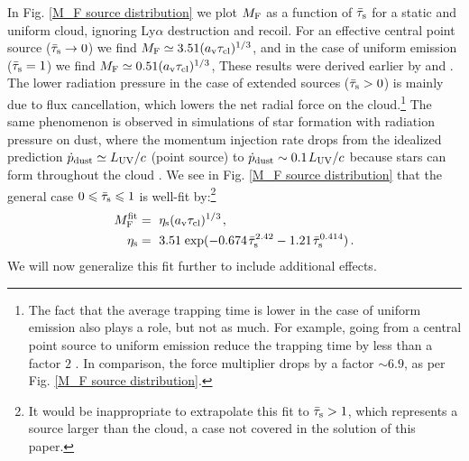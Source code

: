 \documentclass[fleqn,usenatbib]{mnras}
\newcommand{\taucl}{\tau_{\rm cl}}
\begin{document}
In Fig. \ref{M_F source distribution} we plot $M_{\rm F}$ as a function of $\Bar{\tau}_{\rm s}$ for a static and uniform cloud, ignoring Ly$\alpha$ destruction and recoil. For an effective central point source ($\Bar{\tau}_{\rm s} \rightarrow 0$) we find $M_{\rm F} \simeq 3.51 (a_{\rm v} \taucl)^{1/3}$, and in the case of uniform emission ($\Bar{\tau}_{\rm s} = 1$) we find $M_{\rm F} \simeq 0.51 (a_{\rm v} \taucl)^{1/3}$, These results were derived earlier by \cite{Lao2020} and \cite{Tomaselli2021}. The lower radiation pressure in the case of extended sources ($\Bar{\tau}_{\rm s} > 0$) is mainly due to flux cancellation, which lowers the net radial force on the cloud.\footnote{The fact that the average trapping time is lower in the case of uniform emission also plays a role, but not as much. For example, going from a central point source to uniform emission reduce the trapping time by less than a factor $2$ \citep[see fig. 1 in][]{Lao2020}. In comparison, the force multiplier drops by a factor $\sim 6.9$, as per Fig. \ref{M_F source distribution}.} The same phenomenon is observed in simulations of star formation with radiation pressure on dust, where the momentum injection rate drops from the idealized prediction $\Dot{p}_{\rm dust} \simeq L_{\rm UV}/c$ (point source) to $\Dot{p}_{\rm dust} \sim 0.1 \hspace{1 pt} L_{\rm UV}/c$ because stars can form throughout the cloud \citep{Kim2018_RadPressure, Menon2023_directRP}.
We see in Fig. \ref{M_F source distribution} that the general case $0 \leq \Bar{\tau}_{\rm s} \leq 1$ is well-fit by:\footnote{It would be inappropriate to extrapolate this fit to $\Bar{\tau}_{\rm s} > 1$, which represents a source larger than the cloud, a case not covered in the solution of this paper.}
\begin{align}
    M_{\rm F}^{\rm fit} &=~ \eta_{\rm s} (a_{\rm v} \taucl)^{1/3} \hspace{1 pt} , \nonumber \\ 
    \eta_{\rm s} &=~ 3.51 \hspace{1 pt} \exp(- 0.674 \hspace{1 pt} \Bar{\tau}_{\rm s}^{2.42} - 1.21 \hspace{1 pt} \Bar{\tau}_{\rm s}^{0.414}) \, .  \label{M_F fit source distribution} 
\end{align}
We will now generalize this fit further to include additional effects. 
\end{document}
